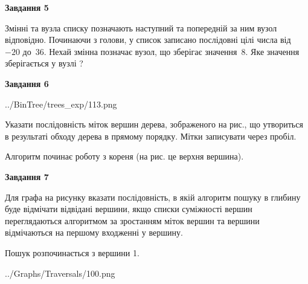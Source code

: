 \documentclass[12pt, ukrainian]{article}
\begin{document}
{\begin {large}
{\begin {center}\textbf{Завдання 5}\end {center}}\par
Змінні  та  вузла списку позначають наступний та попередній за ним вузол відповідно. Починаючи з голови, у список записано послідовні цілі числа від~$-20$ до~$36$. Нехай змінна  позначає вузол, що зберігає значення~$8$.
Яке значення зберігається у вузлі  ?\par
\newpage

{\begin {center}\textbf{Завдання 6}\end {center}}\par

\begin{center}
	{../BinTree/trees_exp/113.png}
\end{center}
Указати послідовність міток вершин дерева, зображеного на рис., що утвориться в результаті обходу дерева в прямому порядку. Мітки записувати через пробіл.\par Алгоритм починає роботу з кореня (на рис. це верхня вершина).\par
\newpage

{\begin {center}\textbf{Завдання 7}\end {center}}\par
Для графа на рисунку вказати послідовність, в якій алгоритм пошуку в глибину буде відмічати відвідані вершини, якщо списки суміжності вершин переглядаються алгоритмом за зростанням міток вершин та вершини відмічаються на першому вход\-женні у вершину.\par
Пошук розпочинається з вершини 1.\par

\begin{center}
	{../Graphs/Traversals/100.png}
\end{center}\par
\newpage


\end{large}}
\end{document}
